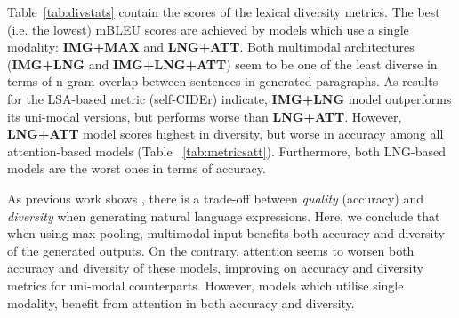 \documentclass[11pt,a4paper]{article}
\begin{document}
Table~\ref{tab:divstats} contain the scores of the lexical diversity metrics. %
The best (i.e. the lowest) mBLEU scores are achieved by models which use a single modality: \textbf{IMG+MAX} and \textbf{LNG+ATT}.
Both multimodal architectures (\textbf{IMG+LNG} and \textbf{IMG+LNG+ATT}) seem to be one of the least diverse in terms of n-gram overlap between sentences in generated paragraphs. %
As results for the LSA-based metric (self-CIDEr) indicate, \textbf{IMG+LNG} model outperforms its uni-modal versions, but performs worse than \textbf{LNG+ATT}. %
However, \textbf{LNG+ATT} model scores highest in diversity, but worse in accuracy among all attention-based models (Table ~\ref{tab:metricsatt}). %
Furthermore, both LNG-based models are the worst ones in terms of accuracy.

As previous work shows \cite{Caccia2018,Holtzman2019}, there is a trade-off between \textit{quality} (accuracy) and \textit{diversity} when generating natural language expressions. %
Here, we conclude that when using max-pooling, multimodal input benefits both accuracy and diversity of the generated outputs. %
On the contrary, attention seems to worsen both accuracy and diversity of these models, improving on accuracy and diversity metrics for uni-modal counterparts. %
However, models which utilise single modality, benefit from attention in both accuracy and diversity. %
\end{document}
